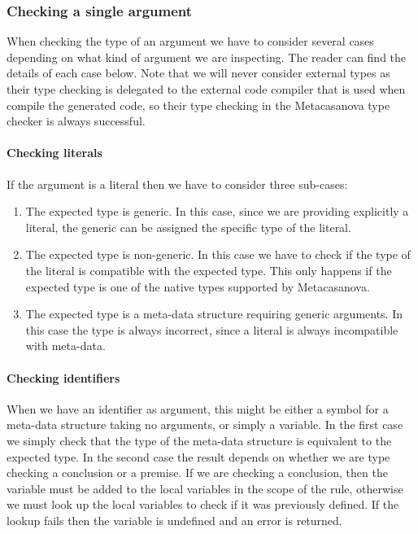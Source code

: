 \subsubsection{Checking a single argument}
\label{subsec:ch_metacasanova_argument_check}
When checking the type of an argument we have to consider several cases depending on what kind of argument we are inspecting. The reader can find the details of each case below. Note that we will never consider external types as their type checking is delegated to the external code compiler that is used when compile the generated code, so their type checking in the Metacasanova type checker is always successful.

\paragraph{Checking literals}
If the argument is a literal then we have to consider three sub-cases:

\begin{enumerate}
	\item The expected type is generic. In this case, since we are providing explicitly a literal, the generic can be assigned the specific type of the literal.
	\item The expected type is non-generic. In this case we have to check if the type of the literal is compatible with the expected type. This only happens if the expected type is one of the native types supported by Metacasanova.
	\item The expected type is a meta-data structure requiring generic arguments. In this case the type is always incorrect, since a literal is always incompatible with meta-data.
\end{enumerate}

\paragraph{Checking identifiers}
When we have an identifier as argument, this might be either a symbol for a meta-data structure taking no arguments, or simply a variable. In the first case we simply check that the type of the meta-data structure is equivalent to the expected type. In the second case the result depends on whether we are type checking a conclusion or a premise. If we are checking a conclusion, then the variable must be added to the local variables in the scope of the rule, otherwise we must look up the local variables to check if it was previously defined. If the lookup fails then the variable is undefined and an error is returned.

